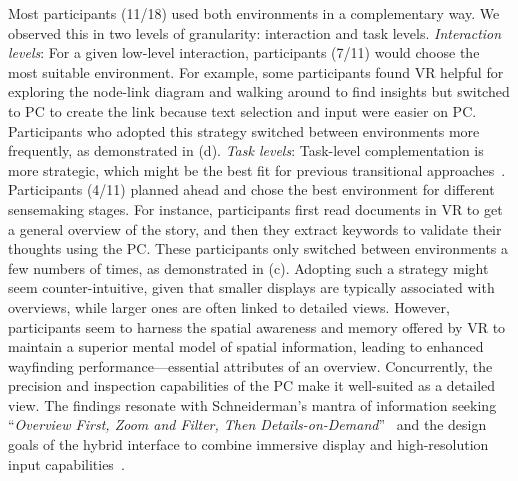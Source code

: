  Most participants (11/18) used both environments in a complementary way. We observed this in two levels of granularity: interaction and task levels.
\textit{Interaction levels}: 
For a given low-level interaction, participants (7/11) would choose the most suitable environment. For example, some participants found VR helpful for exploring the node-link diagram and walking around to find insights but switched to PC to create the link because text selection and input were easier on PC. 
Participants who adopted this strategy switched between environments more frequently, as demonstrated in (d). \textit{Task levels}: Task-level complementation is more strategic, which might be the best fit for previous transitional approaches~\cite{jansen2023autovis,hubenschmid2022relive}. Participants (4/11) planned ahead and chose the best environment for different sensemaking stages.
For instance, participants first read documents in VR to get a general overview of the story, and then they extract keywords to validate their thoughts using the PC. 
These participants only switched between environments a few numbers of times, as demonstrated in (c).
Adopting such a strategy might seem counter-intuitive, given that smaller displays are typically associated with overviews, while larger ones are often linked to detailed views. 
However, participants seem to harness the spatial awareness and memory offered by VR to maintain a superior mental model of spatial information, leading to enhanced wayfinding performance---essential attributes of an overview. Concurrently, the precision and inspection capabilities of the PC make it well-suited as a detailed view.
The findings resonate with Schneiderman's mantra of information seeking ``\textit{Overview First, Zoom and Filter, Then Details-on-Demand}''~\cite{shneiderman1996eyes} and the design goals of the hybrid interface to combine immersive display and high-resolution input capabilities~\cite{feiner1991hybrid}.

